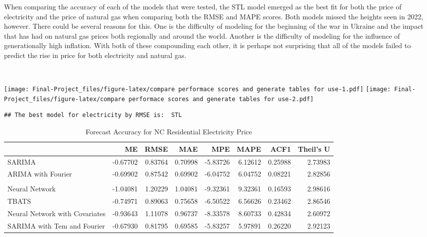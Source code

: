 \documentclass[
]{article}
\begin{document}
When comparing the accuracy of each of the models that were tested, the
STL model emerged as the best fit for both the price of electricity and
the price of natural gas when comparing both the RMSE and MAPE scores.
Both models missed the heights seen in 2022, however. There could be
several reasons for this. One is the difficulty of modeling for the
beginning of the war in Ukraine and the impact that has had on natural
gas prices both regionally and around the world. Another is the
difficulty of modeling for the influence of generationally high
inflation. With both of these compounding each other, it is perhaps not
surprising that all of the models failed to predict the rise in price
for both electricity and natural gas.

~ ~

\texttt{[image: Final-Project\_files/figure-latex/compare performace scores and generate tables for use-1.pdf]}
\texttt{[image: Final-Project\_files/figure-latex/compare performace scores and generate tables for use-2.pdf]}

\begin{verbatim}
## The best model for electricity by RMSE is:  STL
\end{verbatim}

\begin{table}[!h]

\caption{\label{tab:compare performace scores and generate tables for use}Forecast Accuracy for NC Residential Electricity Price}
\centering
\begin{tabular}[t]{l|r|r|r|r|r|r|r}
\hline
  & ME & RMSE & MAE & MPE & MAPE & ACF1 & Theil's U\\
\hline
SARIMA & -0.67702 & 0.83764 & 0.70998 & -5.83726 & 6.12612 & 0.25988 & 2.73983\\
\hline
ARIMA with Fourier & -0.69902 & 0.87542 & 0.69902 & -6.04752 & 6.04752 & 0.08221 & 2.82856\\
\hline
\cellcolor{red}{STL} & \cellcolor{red}{-0.58551} & \cellcolor{red}{0.76708} & \cellcolor{red}{0.63447} & \cellcolor{red}{-5.01390} & \cellcolor{red}{5.43949} & \cellcolor{red}{0.25835} & \cellcolor{red}{2.36056}\\
\hline
Neural Network & -1.04081 & 1.20229 & 1.04081 & -9.32361 & 9.32361 & 0.16593 & 2.98616\\
\hline
TBATS & -0.74971 & 0.89063 & 0.75658 & -6.50522 & 6.56626 & 0.23462 & 2.86546\\
\hline
Neural Network with Covariates & -0.93643 & 1.11078 & 0.96737 & -8.33578 & 8.60733 & 0.42834 & 2.60972\\
\hline
SARIMA with Tem and Fourier & -0.67930 & 0.81795 & 0.69585 & -5.83257 & 5.97891 & 0.26220 & 2.92123\\
\hline
\end{tabular}
\end{table}
\end{document}
